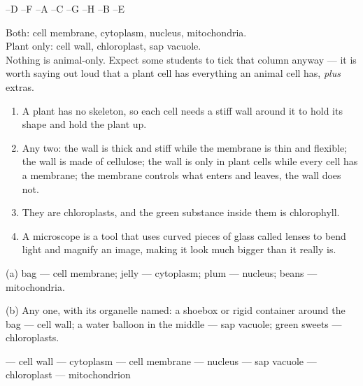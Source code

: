 \documentclass[12pt,a4paper]{article}
\begin{document}
\smallskip
{}

--D --F --A --C --G --H --B --E

\noindent Both: cell membrane, cytoplasm, nucleus, mitochondria. \\
Plant only: cell wall, chloroplast, sap vacuole. \\
{\small Nothing is animal-only. Expect some students to tick that column anyway ---
it is worth saying out loud that a plant cell has everything an animal cell has,
\emph{plus} extras.}

\begin{enumerate}[label=\arabic*., itemsep=3pt]
  \item A plant has no skeleton, so each cell needs a stiff wall around it to hold its
        shape and hold the plant up.
  \item Any two: the wall is thick and stiff while the membrane is thin and flexible;
        the wall is made of cellulose; the wall is only in plant cells while every cell
        has a membrane; the membrane controls what enters and leaves, the wall does not.
  \item They are chloroplasts, and the green substance inside them is chlorophyll.
  \item A microscope is a tool that uses curved pieces of glass called lenses to bend
        light and magnify an image, making it look much bigger than it really is.
\end{enumerate}

\noindent (a) bag --- cell membrane; jelly --- cytoplasm; plum --- nucleus;
beans --- mitochondria.

\smallskip
\noindent (b) Any one, with its organelle named: a shoebox or rigid container around the
bag --- cell wall; a water balloon in the middle --- sap vacuole; green sweets ---
chloroplasts.

 --- cell wall  --- cytoplasm  --- cell membrane  --- nucleus  --- sap vacuole  --- chloroplast  --- mitochondrion

\fi
\end{document}
